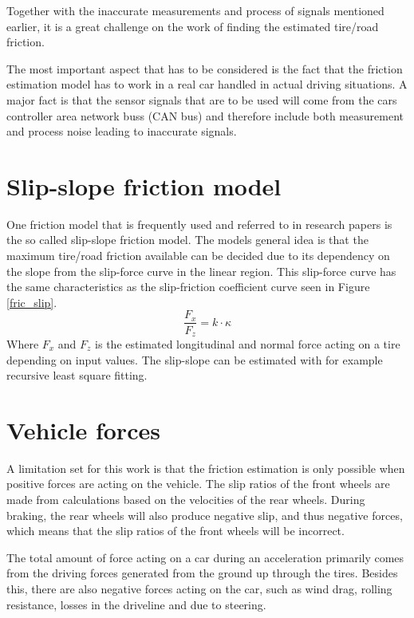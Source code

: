 Together with the inaccurate measurements and process of signals mentioned earlier, it is a great challenge on the work of finding the estimated tire/road friction.  


The most important aspect that has to be considered is the fact that the friction estimation model has to work in a real car handled in actual driving situations. A major fact is that the sensor signals that are to be used  will come from the cars controller area network buss (CAN bus) and therefore include both measurement and process noise leading to inaccurate signals. 


\section{Slip-slope friction model}

One friction model that is frequently used and referred to in research papers is the so called slip-slope friction model. The models general idea is that the maximum tire/road friction available can be decided due to its dependency on the slope from the slip-force curve in the linear region. This slip-force curve has the same characteristics as the slip-friction coefficient curve seen in Figure \ref{fric_slip}. 
\begin{equation}
\dfrac{F_{x}}{F_{z}} = k \cdot \kappa
\end{equation}
Where $ F_{x} $ and $ F_{z} $ is the estimated longitudinal and normal force acting on a tire depending on input values. The slip-slope can be estimated with for example recursive least square fitting.

\section{Vehicle forces}

A limitation set for this work is that the friction estimation is only possible when positive forces are acting on the vehicle. The slip ratios of the front wheels are made from calculations based on the velocities of the rear wheels. During braking, the rear wheels will also produce negative slip, and thus negative forces, which means that the slip ratios of the front wheels will be incorrect. 

The total amount of force acting on a car during an acceleration primarily comes from the driving forces generated from the ground up through the tires. Besides this, there are also negative forces acting on the car, such as wind drag, rolling resistance, losses in the driveline and due to steering. 

